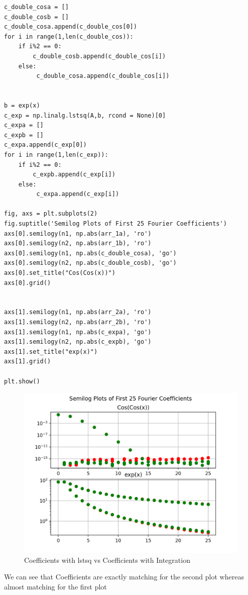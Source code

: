 \documentclass[12pt, a4paper]{report}
\begin{document}
\begin{Verbatim}
c_double_cosa = []
c_double_cosb = []
c_double_cosa.append(c_double_cos[0])
for i in range(1,len(c_double_cos)):
    if i%2 == 0:
        c_double_cosb.append(c_double_cos[i])
    else:
         c_double_cosa.append(c_double_cos[i])


b = exp(x)
c_exp = np.linalg.lstsq(A,b, rcond = None)[0]
c_expa = []
c_expb = []
c_expa.append(c_exp[0])
for i in range(1,len(c_exp)):
    if i%2 == 0:
        c_expb.append(c_exp[i])
    else:
         c_expa.append(c_exp[i])

fig, axs = plt.subplots(2)
fig.suptitle('Semilog Plots of First 25 Fourier Coefficients')
axs[0].semilogy(n1, np.abs(arr_1a), 'ro')
axs[0].semilogy(n2, np.abs(arr_1b), 'ro')
axs[0].semilogy(n1, np.abs(c_double_cosa), 'go')
axs[0].semilogy(n2, np.abs(c_double_cosb), 'go')
axs[0].set_title("Cos(Cos(x))")
axs[0].grid()


axs[1].semilogy(n1, np.abs(arr_2a), 'ro')
axs[1].semilogy(n2, np.abs(arr_2b), 'ro')
axs[1].semilogy(n1, np.abs(c_expa), 'go')
axs[1].semilogy(n2, np.abs(c_expb), 'go')
axs[1].set_title("exp(x)")
axs[1].grid()

plt.show()
\end{Verbatim}


\begin{figure}[!tbh]
   	\centering
   	\includegraphics[scale=0.75]{Q5.png}
   	\caption{Coefficients with lstsq vs Coefficients with Integration}
   	\label{fig:sample}
   \end{figure}
  
 We can see that Coefficients are exactly matching for the second plot whereas almost matching for the first plot
 
\end{document}
